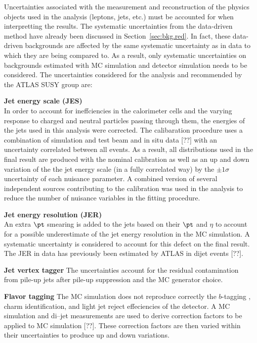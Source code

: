 Uncertainties associated with the measurement and reconstruction of the 
physics objects used in the analysis (leptons, jets, etc.) must be accounted
 for when interpretting the results.
The systematic uncertainties from the data-driven method have already been 
discussed in Section~\ref{sec:bkg.red}. In fact, these data-driven backgrounds 
are affected by the same systematic uncertainty as in data to which they 
are being compared to. As a result, only systematic uncertainties on 
backgrounds estimated with MC simulation and detector simulation needs to 
be considered. The uncertainties considered for the analysis and 
recommended by the ATLAS SUSY group are:

\textbf{Jet energy scale (JES)}  \\  
In order to account for ineffciencies in the calorimeter cells
and the varying response to charged and neutral particles passing through 
them, the energies of the jets used in this analysis were corrected. 
The calibaration procedure uses a combination of simulation and test beam 
and in situ data [??] with an uncertainty correlated between all events.
As a result, all distributions used in the final result are produced 
with the nominal calibration as well as an up and down variation of the 
the jet energy scale (in a fully correlated way) by the 
$\pm 1\sigma$ uncertainty of each nuisance parameter.
A combined version of several independent sources contributing to the 
calibration was used in the analysis 
to reduce the number of nuisance variables in the fitting procedure.


\textbf{Jet energy resolution (JER)} \\ %
An extra $\pt$ smearing is added to the jets based on their $\pt$ and $\eta$ 
to account for a possible underestimate of the jet energy resolution 
in the MC simulation. A systematic
uncertainty is considered to account for this defect on the final result. 
The JER in data has previously been estimated by ATLAS in dijet events [??].


\textbf{Jet vertex tagger}
The uncertainties account for the residual contamination from pile-up jets 
after pile-up suppression and the MC generator choice.

\textbf{Flavor tagging}
The MC simulation does not reproduce correctly the $b$-tagging 
, charm identification, and light jet reject effeciencies of the detector. 
A \ttbar MC simulation and di--jet measurements are used to derive 
correction factors to be applied to MC simulation [??].
These correction factors are then varied within
their uncertainties to produce up and down variations.


